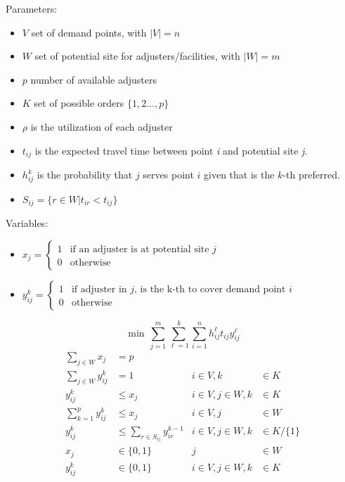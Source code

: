\begin{frame}
  Parameters:
  \begin{itemize}
  \item $V$ set of demand points, with $|V| = n$
  \item $W$ set of potential site for adjusters/facilities, with $|W| = m$
  \item $p$ number of available adjusters
  \item $K$  set of possible orders $\{1,2\ldots,p\}$
  \item $\rho$ is the utilization of each adjuster
  \item $t_{ij}$ is the expected travel time between point \textit{i} and potential site \textit{j}.
  \item $h_{ij}^{k}$ is the probability that $j$ serves point $i$ given that is the $k$-th preferred.
  \item $S_{ij} = \{r\in W | t_{ir} < t_{ij}\}$
  \end{itemize}
  
  Variables:
  \begin{itemize}
  \item $x_j =
    \begin{cases} 
      1 & \mbox{if an adjuster is at potential site } j \\
      0 & \mbox{otherwise}
    \end{cases}$
  \item $y_{ij}^k =
    \begin{cases} 
      1 & \mbox{if adjuster in } j \mbox{, is the k-th to cover demand point }i \\
      0 & \mbox{otherwise}
  \end{cases}$
  \end{itemize}
\end{frame}

\begin{frame}[allowframebreaks]{}{}

{\small
  \begin{equation}
    \min \, \sum_{j=1}^{m}{\sum_{\ell=1}^{k}{\sum_{i=1}^{n}{h_{ij}^{\ell}t_{ij}y_{ij}^{\ell}}}}
  \end{equation}
}
{\small
  \begin{align}
    \sum_{j \in W}{x_j} & = p               &                                  &\\
    \sum_{j \in W}{y_{ij}^{k}} & = 1        &          i \in V, k &\in K \\
    y_{ij}^{k} & \leq x_j                   &  i \in V,j \in W, k &\in K \\
    \sum_{k = 1}^{p}{y_{ij}^{k}} & \leq x_j &          i \in V, j &\in W \\
    y_{ij}^{k} &\leq \sum_{r\in S_{ij}}{y_{ir}^{k-1}} &  i \in V,j \in W, k &\in K/\{1\} \\
    x_{j} & \in \{0,1\}      &                  j &\in W \nonumber\\
    y_{ij}^{k} & \in \{0,1\} &  i \in V,j \in W,k &\in K \nonumber
  \end{align}
}
\end{frame}

